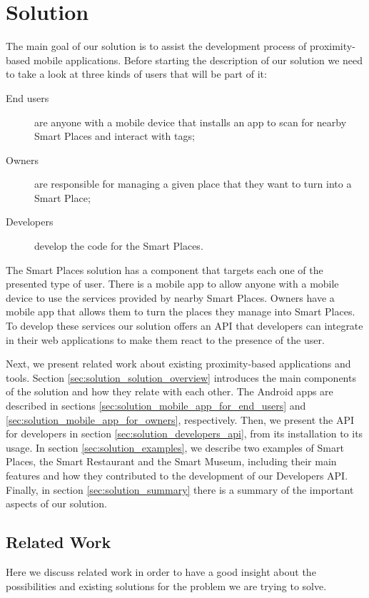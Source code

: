 
\chapter{Solution}
\label{chapter:solution}
The main goal of our solution is to assist
the development process of proximity-based mobile applications.
Before starting the description of our solution we need to take a look at three kinds of users that will be part of it:
\begin{description}
  \item[End users] are anyone with a mobile device that installs an app to scan for nearby Smart Places and interact with tags;
  \item[Owners] are responsible for managing a given place that they want to turn into a Smart Place;
  \item[Developers] develop the code for the Smart Places.
\end{description}

The Smart Places solution has a component that targets each one of the presented type of user.
There is a mobile app to allow anyone with a mobile device to use the services provided by nearby Smart Places.
Owners have a mobile app that allows them to turn the places they manage into Smart Places.
To develop these services our solution offers an \gls{API} that developers can integrate in their web applications to make them react to the presence of the user.

Next, we present related work about existing proximity-based applications and tools.
Section \ref{sec:solution_solution_overview} introduces the main components of the solution and how they relate with each other.
The Android apps are described in sections \ref{sec:solution_mobile_app_for_end_users} and \ref{sec:solution_mobile_app_for_owners}, respectively.
Then, we present the \gls{API} for developers in section \ref{sec:solution_developers_api}, from its installation to its usage.
In section \ref{sec:solution_examples}, we describe two examples of Smart Places, the Smart Restaurant and the Smart Museum, including their main features and how they contributed to the development of our Developers \gls{API}.
Finally, in section \ref{sec:solution_summary} there is a summary of the important aspects of our solution.

\section{Related Work}
\label{sec:background_related_work}
Here we discuss related work in order to have a good insight about the possibilities and existing solutions for the problem we are trying to solve.

